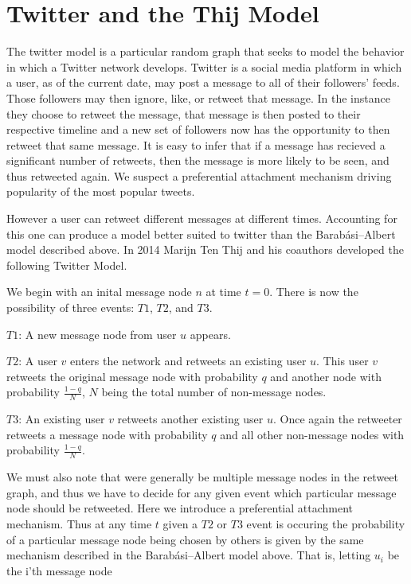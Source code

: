 \chapter{Twitter and the Thij Model}
The twitter model is a particular random graph that seeks to model the behavior in which a Twitter network 
develops. Twitter is a social media platform in which a user, as of the current date, may post a message
to all of their followers' feeds. Those followers may then ignore, like, or retweet that message. In the
instance they choose to retweet the message, that message is then posted to their respective timeline and a 
new set of followers now has the opportunity to then retweet that same message. It is easy to infer that if a 
message has recieved a significant number of retweets, then the message is more likely to be seen, and thus
retweeted again. We suspect a preferential attachment mechanism driving popularity of the most popular tweets.

However a user can retweet different messages at different times. Accounting for this one can produce
a model better suited to twitter than the Barabási–Albert model described above. In 2014 Marijn Ten Thij
and his coauthors developed the following Twitter Model. \cite{thij} 

We begin with an inital message node $n$ at time $t=0$. There is now the possibility of three events: $T1$,
$T2$, and $T3$.

\vspace{3mm}
$T1$: A new message node from user $u$ appears.

\vspace{3mm}
$T2$: A user $v$ enters the network and retweets an existing user $u$. This user $v$ retweets the original message node with 
probability $q$ and another node with probability $\frac{1-q}{N}$, $N$ being the total number of non-message nodes.

\vspace{3mm}
$T3$: An existing user $v$ retweets another existing user $u$. Once again the retweeter retweets a message node with probability 
$q$ and all other non-message nodes with probability $\frac{1-q}{N}$.

\vspace{3mm}

We must also note that were generally be multiple message nodes in the retweet graph, and thus we have to decide for any given event
which particular message node should be retweeted. Here we introduce a preferential attachment mechanism. Thus at any time $t$
given a $T2$ or $T3$ event is occuring the probability of a particular message node being chosen by others is given by the 
same mechanism described in the Barabási–Albert model above. That is, letting $u_i$ be the i'th message node

